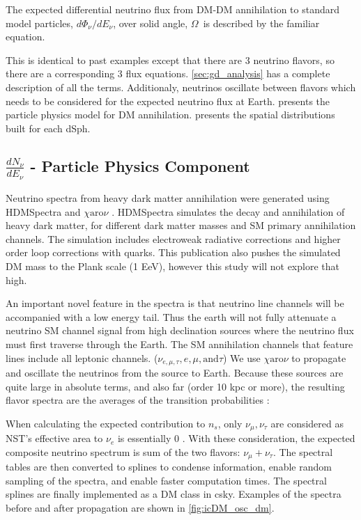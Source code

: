 The expected differential neutrino flux from DM-DM annihilation to standard model
particles, $d\Phi_{\nu}/dE_{\nu}$, over solid angle, $\Omega$~is described by the familiar equation.
\iddmannilation[\nu]

This is identical to past examples except that there are 3 neutrino flavors, so there are a corresponding 3 flux equations.
\cref{sec:gd_analysis} has a complete description of all the terms.
Additionaly, neutrinos oscillate between flavors which needs to be considered for the expected neutrino flux at Earth.
 presents the particle physics model for DM annihilation.
 presents the spatial distributions built for each dSph.

\subsection{$\frac{dN_\nu}{dE_\nu}$ - Particle Physics Component}\label{sec:icDM_particlephysics}

Neutrino spectra from heavy dark matter annihilation were generated using HDMSpectra \cite{HDMSpectra} and $\chi \textrm{aro}\nu$ \cite{Charon}.
HDMSpectra simulates the decay and annihilation of heavy dark matter, for different dark matter masses and SM primary annihilation channels.
The simulation includes electroweak radiative corrections and higher order loop corrections with quarks.
This publication also pushes the simulated DM mass to the Plank scale (1 EeV), however this study will not explore that high.

An important novel feature in the spectra is that neutrino line channels will be accompanied with a low energy tail.
Thus the earth will not fully attenuate a neutrino SM channel signal from high declination sources where the neutrino flux must first traverse through the Earth.
The SM annihilation channels that feature lines include all leptonic channels. ($\nu_{e,\mu,\tau}, e, \mu, \mathrm{and} \tau$)
We use \href{https://iopscience.iop.org/article/10.1088/1475-7516/2020/10/043}{ $\chi \mathrm{aro}\nu$} to propagate and oscillate the neutrinos from the source to Earth.
Because these sources are quite large in absolute terms, and also far (order 10 kpc or more), the resulting flavor spectra are the averages of the transition probabilities \cite{Charon}:
\nuOscMatrix

When calculating the expected contribution to $n_s$, only $ \nu_\mu, \nu_\tau $ are considered as NST's effective area to $ \nu_e $ is essentially 0 \cite{IC3_DM2013}.
With these consideration, the expected composite neutrino spectrum is sum of the two flavors: $\nu_\mu + \nu_\tau$.
The spectral tables are then converted to splines to condense information, enable random sampling of the spectra, and enable faster computation times.
The spectral splines are finally implemented as a DM class in csky.
Examples of the spectra before and after propagation are shown in \cref{fig:icDM_osc_dm}.


